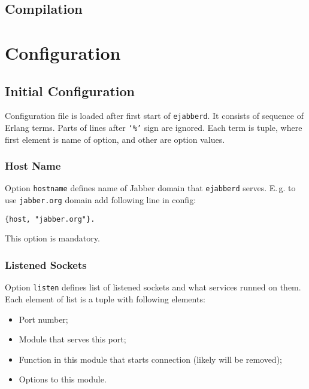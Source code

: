 \documentclass[12pt]{article}
\newcommand{\ejabberd}{\texttt{ejabberd}}
\newcommand{\Jabber}{Jabber}
\begin{document}
\subsection{Compilation}
\label{sec:compilation}






\section{Configuration}
\label{sec:configuration}

\subsection{Initial Configuration}
\label{sec:initconfig}

%

Configuration file is loaded after first start of \ejabberd{}.  It consists of
sequence of Erlang terms.  Parts of lines after \texttt{`\%'} sign are ignored.
Each term is tuple, where first element is name of option, and other are option
values.


\subsubsection{Host Name}
\label{sec:confighostname}

Option \texttt{hostname} defines name of \Jabber{} domain that \ejabberd{}
serves.  E.\,g. to use \texttt{jabber.org} domain add following line in config:
\begin{verbatim}
{host, "jabber.org"}.
\end{verbatim}

This option is mandatory.



\subsubsection{Listened Sockets}
\label{sec:configlistened}

Option \texttt{listen} defines list of listened sockets and what services
runned on them.  Each element of list is a tuple with following elements:
\begin{itemize}
\item Port number;
\item Module that serves this port;
\item Function in this module that starts connection (likely will be removed);
\item Options to this module.
\end{itemize}
\end{document}
